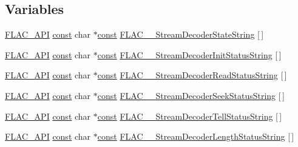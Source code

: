 \subsection*{Variables}
\begin{DoxyCompactItemize}
\item 
\hyperlink{group__flac__export_ga56ca07df8a23310707732b1c0007d6f5}{F\+L\+A\+C\+\_\+\+A\+PI} \hyperlink{zconf_8h_a2c212835823e3c54a8ab6d95c652660e}{const} char $\ast$\hyperlink{zconf_8h_a2c212835823e3c54a8ab6d95c652660e}{const} \hyperlink{group__flac__stream__decoder_gae1c6a6fb59fce39e251233fa221fe61d}{F\+L\+A\+C\+\_\+\+\_\+\+Stream\+Decoder\+State\+String} \mbox{[}$\,$\mbox{]}
\item 
\hyperlink{group__flac__export_ga56ca07df8a23310707732b1c0007d6f5}{F\+L\+A\+C\+\_\+\+A\+PI} \hyperlink{zconf_8h_a2c212835823e3c54a8ab6d95c652660e}{const} char $\ast$\hyperlink{zconf_8h_a2c212835823e3c54a8ab6d95c652660e}{const} \hyperlink{group__flac__stream__decoder_ga34953a802ba44d861dcc8e9f2bb9d659}{F\+L\+A\+C\+\_\+\+\_\+\+Stream\+Decoder\+Init\+Status\+String} \mbox{[}$\,$\mbox{]}
\item 
\hyperlink{group__flac__export_ga56ca07df8a23310707732b1c0007d6f5}{F\+L\+A\+C\+\_\+\+A\+PI} \hyperlink{zconf_8h_a2c212835823e3c54a8ab6d95c652660e}{const} char $\ast$\hyperlink{zconf_8h_a2c212835823e3c54a8ab6d95c652660e}{const} \hyperlink{group__flac__stream__decoder_gadad9526cb960d7d0ac0ca19124d40b2a}{F\+L\+A\+C\+\_\+\+\_\+\+Stream\+Decoder\+Read\+Status\+String} \mbox{[}$\,$\mbox{]}
\item 
\hyperlink{group__flac__export_ga56ca07df8a23310707732b1c0007d6f5}{F\+L\+A\+C\+\_\+\+A\+PI} \hyperlink{zconf_8h_a2c212835823e3c54a8ab6d95c652660e}{const} char $\ast$\hyperlink{zconf_8h_a2c212835823e3c54a8ab6d95c652660e}{const} \hyperlink{group__flac__stream__decoder_gac793d777a3d5a63e735415b9bea5b20a}{F\+L\+A\+C\+\_\+\+\_\+\+Stream\+Decoder\+Seek\+Status\+String} \mbox{[}$\,$\mbox{]}
\item 
\hyperlink{group__flac__export_ga56ca07df8a23310707732b1c0007d6f5}{F\+L\+A\+C\+\_\+\+A\+PI} \hyperlink{zconf_8h_a2c212835823e3c54a8ab6d95c652660e}{const} char $\ast$\hyperlink{zconf_8h_a2c212835823e3c54a8ab6d95c652660e}{const} \hyperlink{group__flac__stream__decoder_ga907456321fb657036c7d5a48ef2adfa6}{F\+L\+A\+C\+\_\+\+\_\+\+Stream\+Decoder\+Tell\+Status\+String} \mbox{[}$\,$\mbox{]}
\item 
\hyperlink{group__flac__export_ga56ca07df8a23310707732b1c0007d6f5}{F\+L\+A\+C\+\_\+\+A\+PI} \hyperlink{zconf_8h_a2c212835823e3c54a8ab6d95c652660e}{const} char $\ast$\hyperlink{zconf_8h_a2c212835823e3c54a8ab6d95c652660e}{const} \hyperlink{group__flac__stream__decoder_ga434d91c0bf414d7c432bc6e761bdd55e}{F\+L\+A\+C\+\_\+\+\_\+\+Stream\+Decoder\+Length\+Status\+String} \mbox{[}$\,$\mbox{]}

\end{DoxyCompactItemize}
